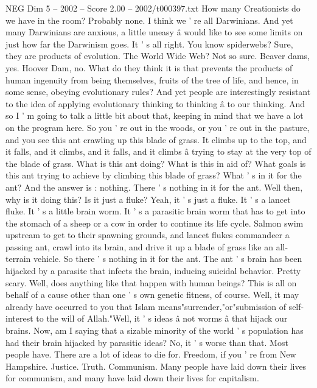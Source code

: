\begin{textsample}{NEG Dim 5 – 2002 – Score 2.00 – 2002/t000397.txt}  \label{ex:f5_neg_079}
How many Creationists do we have in the room?
Probably none.
I think we ' re all Darwinians.
And yet many Darwinians are anxious, a little uneasy â would like to see some limits on just how far the Darwinism goes.
It ' s all right.
You know spiderwebs?
Sure, they are products of evolution.
The World Wide Web?
Not so sure.
Beaver dams, yes.
Hoover Dam, no.
What do they think it is that prevents the products of human ingenuity from being themselves, fruits of the tree of life, and hence, in some sense, obeying evolutionary rules?
And yet people are interestingly resistant to the idea of applying evolutionary thinking to thinking â to our thinking.
And so I ' m going to talk a little bit about that, keeping in mind that we have a lot on the program here.
So you ' re out in the woods, or you ' re out in the pasture, and you see this ant crawling up this blade of grass.
It climbs up to the top, and it falls, and it climbs, and it falls, and it climbs â trying to stay at the very top of the blade of grass.
What is this ant doing?
What is this in aid of?
What goals is this ant trying to achieve by climbing this blade of grass?
What ' s in it for the ant?
And the answer is : nothing.
There ' s nothing in it for the ant.
Well then, why is it doing this?
Is it just a fluke?
Yeah, it ' s just a fluke.
It ' s a lancet fluke.
It ' s a little brain worm.
It ' s a parasitic brain worm that has to get into the stomach of a sheep or a cow in order to continue its life cycle.
Salmon swim upstream to get to their spawning grounds, and lancet flukes commandeer a passing ant, crawl into its brain, and drive it up a blade of grass like an all-terrain vehicle.
So there ' s nothing in it for the ant.
The ant ' s brain has been hijacked by a parasite that infects the brain, inducing suicidal behavior.
Pretty scary.
Well, does anything like that happen with human beings?
This is all on behalf of a cause other than one ' s own genetic fitness, of course.
Well, it may already have occurred to you that Islam means"surrender,"or"submission of self-interest to the will of Allah."Well, it ' s ideas â not worms â that hijack our brains.
Now, am I saying that a sizable minority of the world ' s population has had their brain hijacked by parasitic ideas?
No, it ' s worse than that.
Most people have.
There are a lot of ideas to die for.
Freedom, if you ' re from New Hampshire.
Justice.
Truth.
Communism.
Many people have laid down their lives for communism, and many have laid down their lives for capitalism.

\end{textsample}
